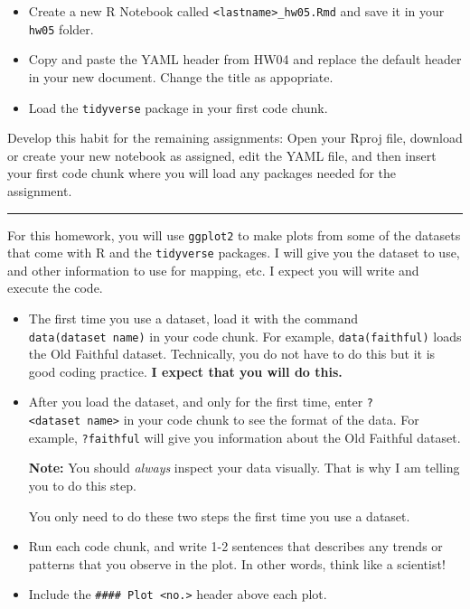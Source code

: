 \documentclass[]{article}
\begin{document}
\begin{itemize}
\item
  Create a new R Notebook called
  \texttt{\textless{}lastname\textgreater{}\_hw05.Rmd} and save it in
  your \texttt{hw05} folder.
\item
  Copy and paste the YAML header from HW04 and replace the default
  header in your new document. Change the title as appopriate.
\item
  Load the \texttt{tidyverse} package in your first code chunk.
\end{itemize}

Develop this habit for the remaining assignments: Open your Rproj file,
download or create your new notebook as assigned, edit the YAML file,
and then insert your first code chunk where you will load any packages
needed for the assignment.

\begin{center}\rule{0.5\linewidth}{\linethickness}\end{center}

For this homework, you will use \texttt{ggplot2} to make plots from some
of the datasets that come with R and the \texttt{tidyverse} packages. I
will give you the dataset to use, and other information to use for
mapping, etc. I expect you will write and execute the code.

\begin{itemize}
\item
  The first time you use a dataset, load it with the command
  \texttt{data(dataset\ name)} in your code chunk. For example,
  \texttt{data(faithful)} loads the Old Faithful dataset. Technically,
  you do not have to do this but it is good coding practice. \textbf{I
  expect that you will do this.}
\item
  After you load the dataset, and only for the first time, enter
  \texttt{?\textless{}dataset\ name\textgreater{}} in your code chunk to
  see the format of the data. For example, \texttt{?faithful} will give
  you information about the Old Faithful dataset.

  \textbf{Note:} You should \emph{always} inspect your data visually.
  That is why I am telling you to do this step.

  You only need to do these two steps the first time you use a dataset.
\item
  Run each code chunk, and write 1-2 sentences that describes any trends
  or patterns that you observe in the plot. In other words, think like a
  scientist!
\item
  Include the \texttt{\#\#\#\#\ Plot\ \textless{}no.\textgreater{}}
  header above each plot.
\end{itemize}
\end{document}
